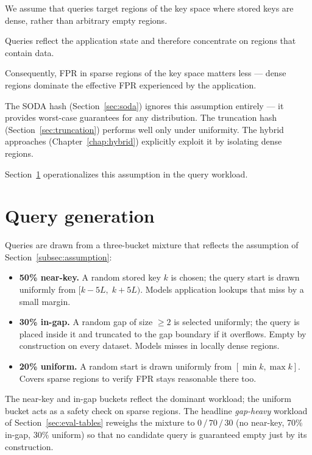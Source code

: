 We assume that queries target regions of the key space where stored keys are dense,
rather than arbitrary empty regions.

\begin{assumption}
    Queries reflect the application state and therefore concentrate on
    regions that contain data.
\end{assumption}

Consequently, FPR in sparse regions of the key space matters less --- dense regions
dominate the effective FPR experienced by the application.

The SODA hash (Section~\ref{sec:soda}) ignores this assumption entirely --- it provides
worst-case guarantees for any distribution. The truncation hash
(Section~\ref{sec:truncation}) performs well only under uniformity. The hybrid approaches
(Chapter~\ref{chap:hybrid}) explicitly exploit it by isolating dense regions.

Section~\ref{sec:query-distribution} operationalizes this assumption
in the query workload.

\section{Query generation}\label{sec:query-distribution}

Queries are drawn from a three-bucket mixture that reflects
the assumption of Section~\ref{subsec:assumption}:

\begin{itemize}
    \item \textbf{50\% near-key.}
    A random stored key $k$ is chosen; the query start is drawn
    uniformly from $[k - 5L,\; k + 5L)$.
    Models application lookups that miss by a small margin.
    \item \textbf{30\% in-gap.}
    A random gap of size $\geq 2$ is selected uniformly; the query
    is placed inside it and truncated to the gap boundary if it
    overflows. Empty by construction on every dataset.
    Models misses in locally dense regions.
    \item \textbf{20\% uniform.}
    A random start is drawn uniformly from $[\min k, \max k]$.
    Covers sparse regions to verify FPR stays reasonable there too.
\end{itemize}

The near-key and in-gap buckets reflect the dominant workload;
the uniform bucket acts as a safety check on sparse regions.
The headline \emph{gap-heavy} workload of
Section~\ref{sec:eval-tables} reweighs the mixture to
$0\,/\,70\,/\,30$ (no near-key, 70\% in-gap, 30\% uniform) so that no
candidate query is guaranteed empty just by its construction.

